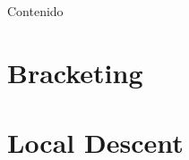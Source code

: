 \documentclass{beamer}
\begin{document}


\begin{frame}{Contenido}
    \tableofcontents
\end{frame}

\section{Bracketing}






\section{Local Descent}




\end{document}
